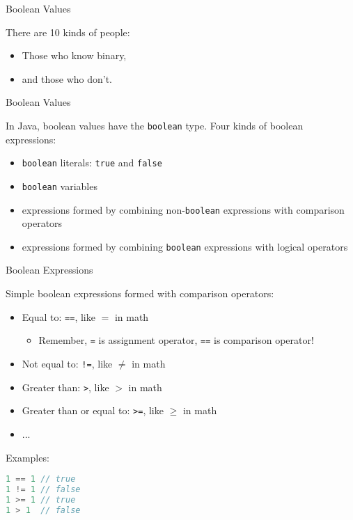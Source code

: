 \documentclass{beamer}
\author[Chris Simpkins] 
{Christopher Simpkins \\\texttt{chris.simpkins@gatech.edu}}
\institute[Georgia Tech] %
\date{}
\begin{document}
\begin{frame}
  \titlepage
\end{frame}

\begin{frame}[fragile]{Boolean Values}


There are 10 kinds of people:
\pause
\begin{itemize}
\item Those who know binary,
\pause
\item and those who don't.
\end{itemize}


\end{frame}

\begin{frame}[fragile]{Boolean Values}


In Java, boolean values have the {\tt boolean} type.  Four kinds of boolean expressions:
\begin{itemize}
\item {\tt boolean} literals: {\tt true} and {\tt false}
\item {\tt boolean} variables
\item expressions formed by combining non-{\tt boolean} expressions with comparison operators
\item expressions formed by combining {\tt boolean} expressions with logical operators
\end{itemize}


\end{frame}


\begin{frame}[fragile]{Boolean Expressions}


Simple boolean expressions formed with comparison operators:
\begin{itemize}
\item Equal to: {\tt ==}, like $=$ in math
  \begin{itemize}
    \item Remember, {\tt =} is assignment operator, {\tt ==} is comparison operator!
  \end{itemize}
\item Not equal to: {\tt !=}, like $\ne$ in math
\item Greater than: {\tt >}, like $>$ in math
\item Greater than or equal to: {\tt >=}, like $\ge$ in math
\item ...
\end{itemize}
Examples:
\begin{lstlisting}[language=Java]
1 == 1 // true
1 != 1 // false
1 >= 1 // true
1 > 1  // false
\end{lstlisting}

\end{frame}
\end{document}
